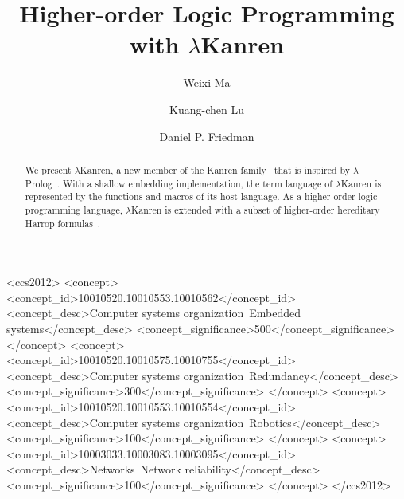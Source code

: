 \documentclass[acmlarge,review]{acmart}
\title{Higher-order Logic Programming with $\lambda$Kanren}
\theoremstyle{definition}
\begin{document}

\author{Weixi Ma}
\author{Kuang-chen Lu}
\author{Daniel P. Friedman}


\begin{abstract}
  We present $\lambda$Kanren, a new member of the Kanren
family~\citep{friedman_reasoned_2018}
that is inspired by $\lambda$Prolog~\citep{miller_programming_2012}.
With a shallow embedding implementation, the term language of $\lambda$Kanren
is represented by the functions and macros of its host language. As a
higher-order logic programming language, $\lambda$Kanren is extended with
a subset of higher-order hereditary Harrop formulas~\citep{miller_uniform_1991}.
\end{abstract}
\begin{CCSXML}
<ccs2012>
 <concept>
  <concept_id>10010520.10010553.10010562</concept_id>
  <concept_desc>Computer systems organization~Embedded systems</concept_desc>
  <concept_significance>500</concept_significance>
 </concept>
 <concept>
  <concept_id>10010520.10010575.10010755</concept_id>
  <concept_desc>Computer systems organization~Redundancy</concept_desc>
  <concept_significance>300</concept_significance>
 </concept>
 <concept>
  <concept_id>10010520.10010553.10010554</concept_id>
  <concept_desc>Computer systems organization~Robotics</concept_desc>
  <concept_significance>100</concept_significance>
 </concept>
 <concept>
  <concept_id>10003033.10003083.10003095</concept_id>
  <concept_desc>Networks~Network reliability</concept_desc>
  <concept_significance>100</concept_significance>
 </concept>
</ccs2012>
\end{CCSXML}
\end{document}
